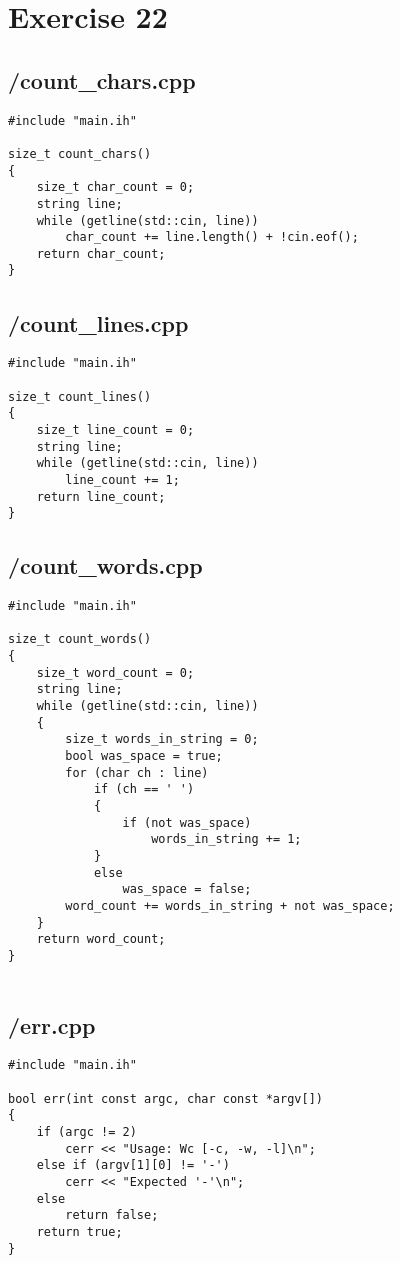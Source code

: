 \documentclass{article}
\begin{document}
\section*{Exercise 22}
\subsection*{/count\_chars.cpp}
\begin{verbatim}
#include "main.ih"

size_t count_chars()
{
    size_t char_count = 0;
    string line;
    while (getline(std::cin, line)) 
        char_count += line.length() + !cin.eof();
    return char_count;
}
\end{verbatim}
\subsection*{/count\_lines.cpp}
\begin{verbatim}
#include "main.ih"

size_t count_lines()
{
    size_t line_count = 0;
    string line;
    while (getline(std::cin, line)) 
        line_count += 1;
    return line_count;
}

\end{verbatim}
\subsection*{/count\_words.cpp}
\begin{verbatim}
#include "main.ih"

size_t count_words()
{
    size_t word_count = 0;
    string line;
    while (getline(std::cin, line)) 
    {
        size_t words_in_string = 0;
        bool was_space = true;
        for (char ch : line)
            if (ch == ' ')
            {
                if (not was_space)
                    words_in_string += 1;
            }
            else
                was_space = false;
        word_count += words_in_string + not was_space;
    }
    return word_count;
}
    
\end{verbatim}
\subsection*{/err.cpp}
\begin{verbatim}
#include "main.ih"

bool err(int const argc, char const *argv[])
{
    if (argc != 2)
        cerr << "Usage: Wc [-c, -w, -l]\n";
    else if (argv[1][0] != '-')
        cerr << "Expected '-'\n";
    else
        return false;
    return true;
}

\end{verbatim}
\end{document}

